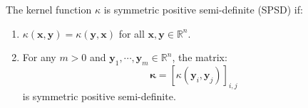 \documentclass{huhtakm-template-book-v2}
\begin{document}
    \begin{defn}
        The kernel function $\kappa$ is symmetric positive semi-definite (SPSD) if:
        \begin{enumerate}
            \item $\kappa(\mathbf{x},\mathbf{y})=\kappa(\mathbf{y},\mathbf{x})$ for all $\mathbf{x},\mathbf{y}\in\mathbb{R}^{n}$.
            \item For any $m>0$ and $\mathbf{y}_{1},\cdots,\mathbf{y}_{m}\in\mathbb{R}^{n}$, the matrix:
            \begin{equation*}
                \boldsymbol{\kappa}=[\kappa(\mathbf{y}_{i},\mathbf{y}_{j})]_{i,j}
            \end{equation*}
            is symmetric positive semi-definite.
        \end{enumerate}
    \end{defn}
    \newpage
\end{document}

